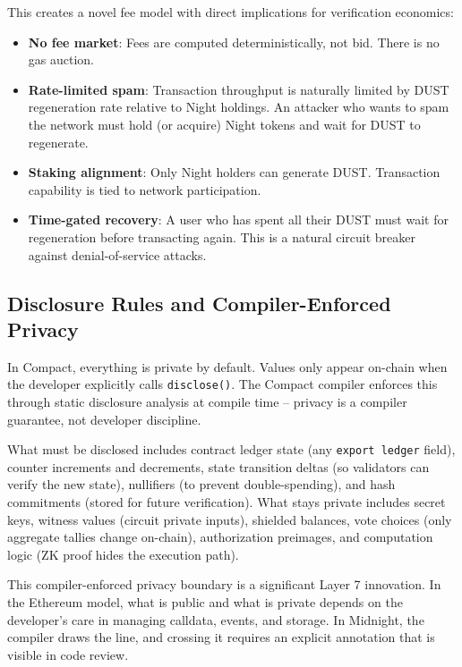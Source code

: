 \documentclass[
  11pt,
  openany]{report}
\providecommand{\tightlist}{%
  \setlength{\itemsep}{0pt}\setlength{\parskip}{0pt}}
\renewcommand{\textbf}[1]{{\bfseries\color{MidnightBold}#1}}
\begin{document}
This creates a novel fee model with direct implications for verification
economics:

\begin{itemize}
\tightlist
\item
  \textbf{No fee market}: Fees are computed deterministically, not bid. There is
  no gas auction.
\item
  \textbf{Rate-limited spam}: Transaction throughput is naturally limited by
  DUST regeneration rate relative to Night holdings. An attacker who wants to
  spam the network must hold (or acquire) Night tokens and wait for DUST to
  regenerate.
\item
  \textbf{Staking alignment}: Only Night holders can generate DUST. Transaction
  capability is tied to network participation.
\item
  \textbf{Time-gated recovery}: A user who has spent all their DUST must wait
  for regeneration before transacting again. This is a natural circuit breaker
  against denial-of-service attacks.
\end{itemize}

\subsection{Disclosure Rules and Compiler-Enforced
Privacy}\label{disclosure-rules-and-compiler-enforced-privacy}

In Compact, everything is private by default. Values only appear on-chain when
the developer explicitly calls \texttt{disclose()}. The Compact compiler
enforces this through static disclosure analysis at compile time -- privacy is a
compiler guarantee, not developer discipline.

What must be disclosed includes contract ledger state (any
\texttt{export\ ledger} field), counter increments and decrements, state
transition deltas (so validators can verify the new state), nullifiers (to
prevent double-spending), and hash commitments (stored for future verification).
What stays private includes secret keys, witness values (circuit private
inputs), shielded balances, vote choices (only aggregate tallies change
on-chain), authorization preimages, and computation logic (ZK proof hides the
execution path).

This compiler-enforced privacy boundary is a significant Layer 7 innovation. In
the Ethereum model, what is public and what is private depends on the
developer's care in managing calldata, events, and storage. In Midnight, the
compiler draws the line, and crossing it requires an explicit annotation that is
visible in code review.
\end{document}
